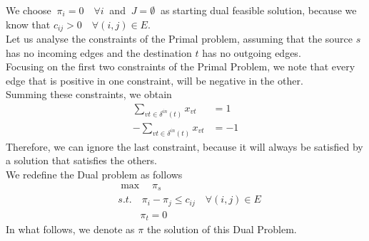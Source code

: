\documentclass[a4paper,11pt]{article}
\begin{document}
We choose $\ \pi_i =0 \quad \forall i \ $ and $\ J = \emptyset \ $ as starting dual feasible solution, because we know that $c_{ij} > 0 \quad \forall (i,j) \in E$. \\
Let us analyse the constraints of the Primal problem, assuming that the source $s$ has no incoming edges and the destination $t$ has no outgoing edges. \\ 
Focusing on the first two constraints of the Primal Problem, we note that every edge that is positive in one constraint, will be negative in the other.\\ 
Summing these constraints, we obtain
\begin{align*}
	\sum_{vt\in \delta^{in}(t)} x_{vt} &= 1\\
	- \sum_{vt\in \delta^{in}(t)} x_{vt} &= -1
\end{align*}
Therefore, we can ignore the last constraint, because it will always be satisfied by a solution that satisfies the others.\\
We redefine the Dual problem as follows
\begin{align*}
	&\max \quad \pi_s\\
	&s.t. \quad \pi_i - \pi_j \le c_{ij} \quad \forall (i,j) \in E\\
	&\qquad \ \pi_t = 0
\end{align*}
In what follows, we denote as $\pi$ the solution of this Dual Problem.\\
\end{document}
